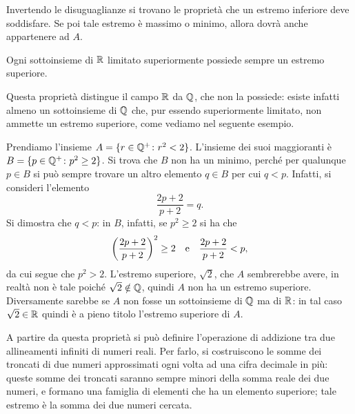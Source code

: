 Invertendo le disuguaglianze si trovano le proprietà che un estremo inferiore deve soddisfare. Se poi tale estremo è massimo o minimo, allora dovrà anche appartenere ad $A$.
\begin{proprieta}
Ogni sottoinsieme di $\mathbb{R}$ limitato superiormente possiede sempre un estremo superiore.
\end{proprieta}
Questa proprietà distingue il campo $\mathbb{R}$ da $\mathbb{Q}$, che non la possiede: esiste infatti almeno un sottoinsieme di $\mathbb{Q}$ che, pur essendo superiormente limitato, non ammette un estremo superiore, come vediamo nel seguente esempio.
\begin{esempio} \label{es:non-esiste-sempre-sup-in-Q}
	Prendiamo l'insieme $A=\{r\in\mathbb{Q}^+\colon r^2<2\}$.
	L'insieme dei suoi maggioranti è $B=\{p\in\mathbb{Q}^+\colon p^2\geq 2\}$.
	Si trova che $B$ non ha un minimo, perché per qualunque $p\in B$ si può sempre trovare un altro elemento $q\in B$ per cui $q<p$.
	Infatti, si consideri l'elemento
	\begin{equation*}
		\frac{2p+2}{p+2}=q.
	\end{equation*}
	Si dimostra che $q<p$: in $B$, infatti, se $p^2\geq 2$ si ha che
	\begin{equation*}
		\bigg(\frac{2p+2}{p+2}\bigg)^2\geq 2\quad\text{e}\quad\frac{2p+2}{p+2}<p,
	\end{equation*}
	da cui segue che $p^2>2$.
	L'estremo superiore, $\sqrt{2}$, che $A$ sembrerebbe avere, in realtà non è tale poiché $\sqrt{2}\notin\mathbb{Q}$, quindi $A$ non ha un estremo superiore.
	Diversamente sarebbe se $A$ non fosse un sottoinsieme di $\mathbb{Q}$ ma di $\mathbb{R}$: in tal caso $\sqrt{2}\in\mathbb{R}$ quindi è a pieno titolo l'estremo superiore di $A$.
\end{esempio}
A partire da questa proprietà si può definire l'operazione di addizione tra due allineamenti infiniti di numeri reali.
Per farlo, si costruiscono le somme dei troncati di due numeri approssimati ogni volta ad una cifra decimale in più: queste somme dei troncati saranno sempre minori della somma reale dei due numeri, e formano una famiglia di elementi che ha un elemento superiore; tale estremo è la somma dei due numeri cercata.


